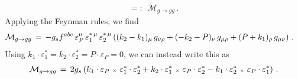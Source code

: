 \begin{example}
\begin{align}
{{        }}
        =:
        \,\,\,
        \mathcal{M}_{g \to gg}
        \,.
    \end{align}
    Applying the Feynman rules, we find
    \begin{align}
        \mathcal{M}_{g \to gg}
        \,
        &=
        \,
        -g_s f^{abc}
        \,
        \varepsilon_P^\mu\, \varepsilon_1^{*\,\mu}\, \varepsilon_2^{*\,\mu}
        \left(
            (k_2 - k_1)_\mu \, g_{\nu\rho}
            + (-k_2 - P)_\nu \, g_{\mu\rho}
            + (P + k_1)_\rho \, g_{\mu\nu}
        \right)
        \,.
    \end{align}
    Using \(k_1 \cdot \varepsilon_1^* = k_2 \cdot \varepsilon_2^* = P \cdot \varepsilon_P = 0\), we can instead write this as
    \begin{align}
        \mathcal{M}_{g \to gg}
        \,
        =
        \,
        2 g_s \left(
            k_1 \cdot \varepsilon_P
            \,\,
            {\scriptscriptstyle\times}
            \,\,
            \varepsilon_1^* \cdot \varepsilon_2^*
            +
            k_2 \cdot \varepsilon_1^*
            \,\,
            {\scriptscriptstyle\times}
            \,\,
            \varepsilon_P \cdot \varepsilon_2^*
            -
            k_1 \cdot \varepsilon_2^*
            \,\,
            {\scriptscriptstyle\times}
            \,\,
            \varepsilon_P \cdot \varepsilon_1^*
        \right)
        \,.
    \end{align}

\end{example}

